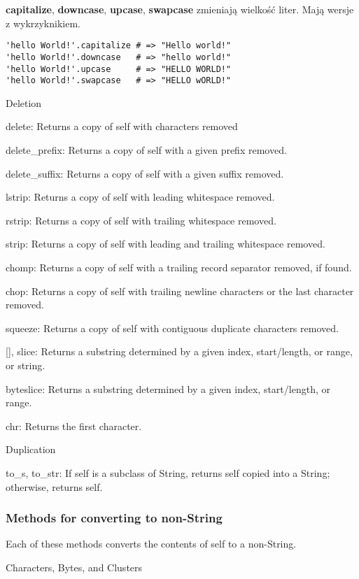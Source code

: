 
\textbf{capitalize}, \textbf{downcase}, \textbf{upcase}, \textbf{swapcase} zmieniają wielkość liter.
Mają wersje z wykrzyknikiem.
\begin{verbatim}
'hello World!'.capitalize # => "Hello world!"
'hello World!'.downcase   # => "hello world!"
'hello World!'.upcase     # => "HELLO WORLD!"
'hello World!'.swapcase   # => "HELLO wORLD!"
\end{verbatim}

Deletion

delete: Returns a copy of self with characters removed

delete\_prefix: Returns a copy of self with a given prefix removed.

delete\_suffix: Returns a copy of self with a given suffix removed.

lstrip: Returns a copy of self with leading whitespace removed.

rstrip: Returns a copy of self with trailing whitespace removed.

strip: Returns a copy of self with leading and trailing whitespace removed.

chomp: Returns a copy of self with a trailing record separator removed, if found.

chop: Returns a copy of self with trailing newline characters or the last character removed.

squeeze: Returns a copy of self with contiguous duplicate characters removed.

[], slice: Returns a substring determined by a given index, start/length, or range, or string.

byteslice: Returns a substring determined by a given index, start/length, or range.

chr: Returns the first character.

Duplication

to\_s, to\_str: If self is a subclass of String, returns self copied into a String; otherwise, returns self.




\subsubsection{Methods for converting to non-String}
Each of these methods converts the contents of self to a non-String.

Characters, Bytes, and Clusters

